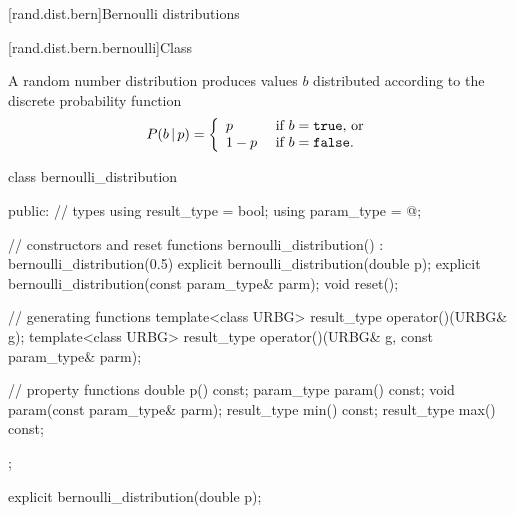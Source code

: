 
[rand.dist.bern]{Bernoulli distributions}%
%
%


[rand.dist.bern.bernoulli]{Class }%
%
%

\pnum
A  random number distribution
produces  values $b$
distributed according to
the discrete probability function
%
%
\[  P(b\,|\,p) = \left\{ \begin{array}{ll}
                          p     & \text{ if $b = \texttt{true}$, or} \\
                          1 - p & \text{ if $b = \texttt{false}$.}
                          \end{array}\right.
\]

%
%
\begin{codeblock}
class bernoulli_distribution {
public:
  // types
  using result_type = bool;
  using param_type  = @\unspec@;

  // constructors and reset functions
  bernoulli_distribution() : bernoulli_distribution(0.5) {}
  explicit bernoulli_distribution(double p);
  explicit bernoulli_distribution(const param_type& parm);
  void reset();

  // generating functions
  template<class URBG>
    result_type operator()(URBG& g);
  template<class URBG>
    result_type operator()(URBG& g, const param_type& parm);

  // property functions
  double p() const;
  param_type param() const;
  void param(const param_type& parm);
  result_type min() const;
  result_type max() const;
};
\end{codeblock}


%
\begin{itemdecl}
explicit bernoulli_distribution(double p);
\end{itemdecl}

